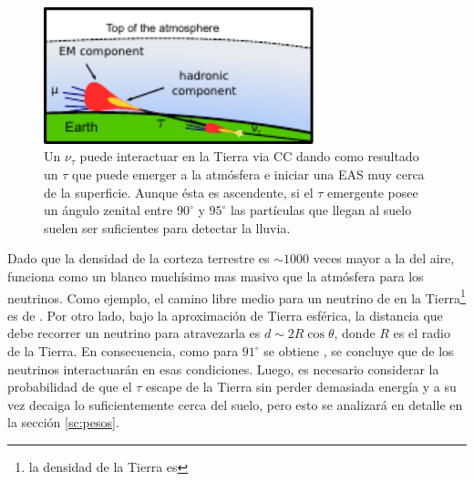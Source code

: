 \begin{figure}[ht]
\begin{center}
\includegraphics[width=0.7\textwidth]{fig/EASAuger/horizontal_es_english.pdf}
\caption{Un $\nu_{\tau}$ puede interactuar en la Tierra via CC dando como resultado un $\tau$ que puede emerger a la atmósfera e iniciar una EAS muy cerca de la superficie.
Aunque \'esta es ascendente, si el $\tau$ emergente posee un ángulo zenital entre $90^\circ$ y $95^\circ$ las partículas que llegan al suelo suelen ser suficientes para detectar la lluvia.}
\label{fig:esNu}
\end{center}
\end{figure}

Dado que la densidad de la corteza terrestre es $\sim1000$ veces mayor a la del aire, funciona como un blanco muchísimo mas masivo que la atmósfera para los neutrinos.
Como ejemplo, el camino libre medio para un neutrino de  en la Tierra\footnote{la densidad de la Tierra es } es de .
Por otro lado, bajo la aproximación de Tierra esférica, la distancia que debe recorrer un neutrino para atravezarla es $d\sim2R\cos{\theta}$, donde $R$ es el radio de la Tierra. 
En consecuencia, como para $91^{\circ}$ se obtiene , se concluye que  de los neutrinos interactuarán en esas condiciones.
Luego, es necesario considerar la probabilidad de que el $\tau$ escape de la Tierra sin perder demasiada energía y a su vez decaiga lo suficientemente cerca del suelo, pero esto se analizará en detalle en la sección \ref{sc:pesos}.
